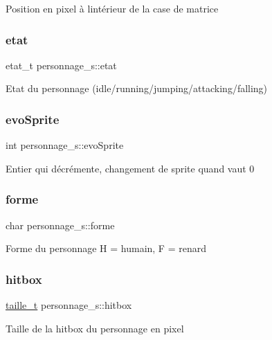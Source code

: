 Position en pixel à l\textquotesingle{}intérieur de la case de matrice \mbox{\label{structpersonnage__s_a2d91f0a1a2e44164875be806c7a456cc}} 
\subsubsection{\texorpdfstring{etat}{etat}}
{\footnotesize\ttfamily etat\+\_\+t personnage\+\_\+s\+::etat}

Etat du personnage (idle/running/jumping/attacking/falling) \mbox{\label{structpersonnage__s_a47750ce89c5dcdb6844e0a98afd5fd75}} 
\subsubsection{\texorpdfstring{evo\+Sprite}{evoSprite}}
{\footnotesize\ttfamily int personnage\+\_\+s\+::evo\+Sprite}

Entier qui décrémente, changement de sprite quand vaut 0 \mbox{\label{structpersonnage__s_a1f1eb200420640259201a84300bccf7e}} 
\subsubsection{\texorpdfstring{forme}{forme}}
{\footnotesize\ttfamily char personnage\+\_\+s\+::forme}

Forme du personnage H = humain, F = renard \mbox{\label{structpersonnage__s_a4a6fd4db944c59eaf1c4006f7e0b533c}} 
\subsubsection{\texorpdfstring{hitbox}{hitbox}}
{\footnotesize\ttfamily \hyperlink{structtaille__s}{taille\+\_\+t} personnage\+\_\+s\+::hitbox}

Taille de la hitbox du personnage en pixel \mbox{\label{structpersonnage__s_a1d76a383232b764037a80a8b39b3c378}} 
